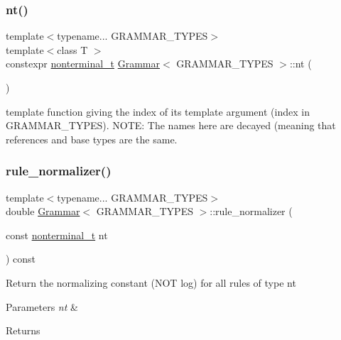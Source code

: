 \mbox{\label{class_grammar_a047b55bfbd87c52e9d969af62c2932ab}} 
\subsubsection{\texorpdfstring{nt()}{nt()}}
{\footnotesize\ttfamily template$<$typename... G\+R\+A\+M\+M\+A\+R\+\_\+\+T\+Y\+P\+ES$>$ \\
template$<$class T $>$ \\
constexpr \hyperlink{_nonterminal_8h_a1c5bfe9b903f69c83bbde5da7035fef3}{nonterminal\+\_\+t} \hyperlink{class_grammar}{Grammar}$<$ G\+R\+A\+M\+M\+A\+R\+\_\+\+T\+Y\+P\+ES $>$\+::nt (\begin{DoxyParamCaption}{ }\end{DoxyParamCaption})\hspace{0.3cm}{\ttfamily [inline]}}

template function giving the index of its template argument (index in G\+R\+A\+M\+M\+A\+R\+\_\+\+T\+Y\+P\+ES). N\+O\+TE\+: The names here are decayed (meaning that references and base types are the same.\mbox{\label{class_grammar_a240019987945a694e26bebcebcf463fc}} 
\subsubsection{\texorpdfstring{rule\+\_\+normalizer()}{rule\_normalizer()}}
{\footnotesize\ttfamily template$<$typename... G\+R\+A\+M\+M\+A\+R\+\_\+\+T\+Y\+P\+ES$>$ \\
double \hyperlink{class_grammar}{Grammar}$<$ G\+R\+A\+M\+M\+A\+R\+\_\+\+T\+Y\+P\+ES $>$\+::rule\+\_\+normalizer (\begin{DoxyParamCaption}\item[{const \hyperlink{_nonterminal_8h_a1c5bfe9b903f69c83bbde5da7035fef3}{nonterminal\+\_\+t}}]{nt }\end{DoxyParamCaption}) const\hspace{0.3cm}{\ttfamily [inline]}}

Return the normalizing constant (N\+OT log) for all rules of type nt 
\begin{DoxyParams}{Parameters}
{\em nt} & \\
\hline
\end{DoxyParams}
\begin{DoxyReturn}{Returns}

\end{DoxyReturn}
\mbox{\label{class_grammar_aba4d092714b8420d8c0a1be63e8566b6}} 
